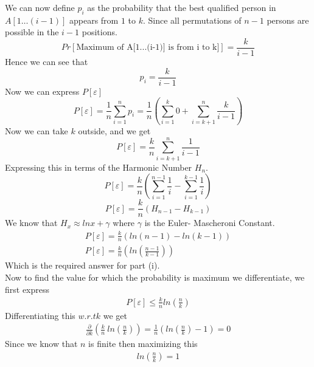 \documentclass{assignment}
\begin{document}
\begin{problemlist}
\begin{problem}
\begin{answer}
We can now define $p_i$ as the probability that the best qualified person in $A[1 \ldots (i-1)]$ appears from $1$ to $k$. Since all permutations of $n-1$ persons are possible in the $i-1$ positions. 
\begin{equation}
 Pr[\textrm{Maximum of A[1...(i-1)] is from i to k]}] = \frac{k}{i-1}
\end{equation}
Hence we can see that 
\begin{equation}
 p_i=\frac{k}{i-1}
\end{equation}
Now we can express $P[\varepsilon]$
\begin{equation}
 P[\varepsilon] = \frac{1}{n} \sum_{i=1}^{n} p_i = \frac{1}{n} \left( \sum_{i=1}^{k} 0 + \sum_{i=k+1}^{n} \frac{k}{i-1} \right)
\end{equation}
Now we can take $k$ outside, and we get 
\begin{equation}
 P[\varepsilon] = \frac{k}{n} \sum_{i=k+1}^{n} \frac{1}{i-1} 
\end{equation}
Expressing this in terms of the Harmonic Number $H_n$.
\begin{equation}
P[\varepsilon] = \frac{k}{n} \left( \sum_{i=1}^{n-1} \frac{1}{i} - \sum_{i=1}^{k-1} \frac{1}{i} \right)    
\end{equation}
\begin{equation}
P[\varepsilon]  = \frac{k}{n} \left( H_{n-1} - H_{k-1} \right)
\end{equation}
We know that $H_x \approx ln x + \gamma $ where $\gamma$ is the Euler- Mascheroni Constant. \\
\begin{eqnarray}
P[\varepsilon]  = \frac{k}{n} \left( ln (n-1)  - ln(k-1)  \right) \\
P[\varepsilon]  = \frac{k}{n} \left( ln (\frac{n-1}{k-1})  \right)
\end{eqnarray}
Which is the required answer for part (i). \\

Now to find the value for which the probability is maximum we differentiate, we first express 
\begin{eqnarray}
P[\varepsilon]  \leq \frac{k}{n}  ln \left( \frac{n}{k}  \right)
\end{eqnarray}
Differentiating this $w.r.t k$ we get 
\begin{eqnarray}
\frac{\partial}{\partial k} \left( \frac{k}{n} \: ln\left( \frac {n}{k} \right) \right)  = \frac{1}{n} \left( ln\left( \frac {n}{k} \right) - 1 \right) = 0
\end{eqnarray}
Since we know that $n$ is finite then maximizing this 
\begin{eqnarray}
 ln\left( \frac {n}{k} \right) = 1
\end{eqnarray}


\end{answer}
\end{problem}
\end{problemlist}
\end{document}
